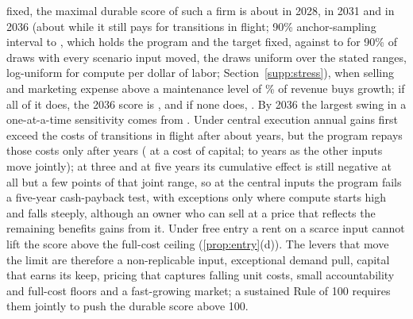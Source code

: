 fixed, the maximal durable score of such a firm is about \CenREight{} in 2028, \CenROne{} in 2031 and \CenRSix{} in 2036 (about \CenRSixNet{} while it still pays for transitions in flight; 90\% anchor-sampling interval \CenRSixLo{} to \CenRSixHi, which holds the program and the target fixed, against \StNetSixPFive{} to \StNetSixPNinetyFive{} for 90\% of draws with every scenario input moved, the draws uniform over the stated ranges, log-uniform for compute per dollar of labor; Section~\ref{supp:stress}), when selling and marketing expense above a maintenance level of \MaintBase\% of revenue buys growth; if all of it does, the 2036 score is \CenRSixAllSM, and if none does, \CenRSixNoSM. By 2036 the largest swing in a one-at-a-time sensitivity comes from \TornFirstSix. Under central execution annual gains first exceed the costs of transitions in flight after about \PayCrossCen{} years, but the program repays those costs only after \PayBackCen{} years (\PayBackDiscCen{} at a \acqRwAnnual{} cost of capital; \StPayCenMin{} to \StPayCenMax{} years as the other inputs move jointly); at three and at five years its cumulative effect is still negative at all but a few points of that joint range, so at the central inputs the program fails a five-year cash-payback test, with exceptions only where compute starts high and falls steeply, although an owner who can sell at a price that reflects the remaining benefits gains from it. Under free entry a rent on a scarce input cannot lift the score above the full-cost ceiling (\autoref{prop:entry}(d)). The levers that move the limit are therefore a non-replicable input, exceptional demand pull, capital that earns its keep, pricing that captures falling unit costs, small accountability and full-cost floors and a fast-growing market; a sustained Rule of 100 requires them jointly to push the durable score above 100.

